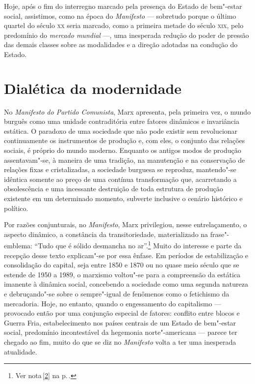 Hoje, após o fim do interregno marcado pela presença do Estado de
bem"-estar social, assistimos, como na época do \textit{Manifesto
} --- sobretudo porque o último quartel do século \textsc{xx} seria marcado, como a
primeira metade do século \textsc{xix}, pelo predomínio do \textit{mercado mundial} ---,
uma inesperada redução do poder de pressão das demais classes sobre as
modalidades e a direção adotadas na condução do Estado.

\section*{Dialética da modernidade}

No \textit{Manifesto do Partido Comunista}, Marx apresenta,
pela primeira vez, o mundo burguês como uma unidade contraditória entre
fatores dinâmicos e invariância estática. O paradoxo de uma sociedade
que não pode existir sem revolucionar continuamente os instrumentos de
produção e, com eles, o conjunto das relações sociais, é próprio do
mundo moderno. Enquanto os antigos modos de produção assentavam"-se, à
maneira de uma tradição, na manutenção e na conservação de relações fixas
e cristalizadas, a sociedade burguesa se reproduz, mantendo"-se
idêntica somente ao preço de uma contínua transformação que,
acarretando a obsolescência e uma incessante destruição de toda
estrutura de produção existente em um determinado momento, subverte
inclusive o cenário histórico e político.

Por razões conjunturais, no \textit{Manifesto}, Marx privilegiou, nesse entrelaçamento, o aspecto dinâmico, a constância
da transitoriedade, materializado na frase"-emblema: ``Tudo que é
sólido desmancha no ar''.\footnote{Ver nota\,\ref{2} na p.\,\pageref{2}.} Muito do interesse e parte da recepção desse
texto explicam"-se por essa ênfase. Em períodos de estabilização e
consolidação do capital, seja entre 1850 e 1870 ou no quase meio século
que se estende de 1950 a 1989, o marxismo voltou"-se para a
compreensão da estática imanente à dinâmica social, concebendo a
sociedade como uma segunda natureza e debruçando"-se sobre o
sempre"-igual de fenômenos como o fetichismo da mercadoria. Hoje, no
entanto, quando o engessamento do capitalismo --- provocado então por uma
conjunção especial de fatores: conflito entre blocos e Guerra Fria,
estabelecimento nos países centrais de um Estado de bem"-estar social,
predomínio incontestável da hegemonia norte"-americana --- parece ter
chegado ao fim, muito do que se diz no \textit{Manifesto} volta a ter
uma inesperada atualidade.

